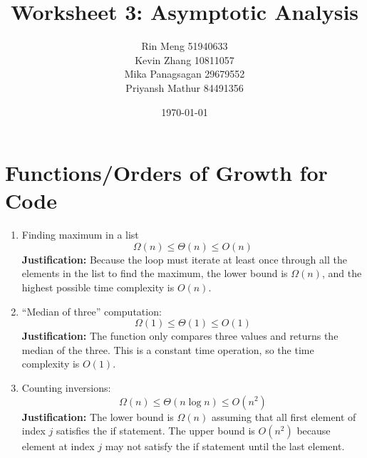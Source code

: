 \documentclass[12pt]{article}
\title{Worksheet 3: Asymptotic Analysis}
\author{Rin Meng 51940633 \\ Kevin Zhang 10811057 \\ Mika Panagsagan 29679552 \\ Priyansh Mathur 84491356}
\date{\today}
\begin{document}
\maketitle

\setcounter{section}{1}

\section{Functions/Orders of Growth for Code}


\begin{enumerate}
    \item Finding maximum in a list 
    \[ \Omega(n) \leq \Theta(n) \leq O(n) \]
    \textbf{Justification:} Because the loop must iterate at least once through all
    the elements in the list to find the maximum, the lower bound is $\Omega(n)$,
    and the highest possible time complexity is $O(n)$.

    \item ``Median of three'' computation:
    \[ \Omega(1) \leq \Theta(1) \leq O(1) \]
    \textbf{Justification:} The function only compares three values and returns 
    the median of the three. This is a constant time operation, 
    so the time complexity is $O(1)$.

    \item Counting inversions:
    \[ \Omega(n) \leq \Theta(n \log n) \leq O(n^2) \]
    \textbf{Justification:} The lower bound is $\Omega(n)$ assuming that all first element
    of index $j$ satisfies the if statement. The upper bound is $O(n^2)$ because element
    at index $j$ may not satisfy the if statement until the last element.
\end{enumerate}
\end{document}
